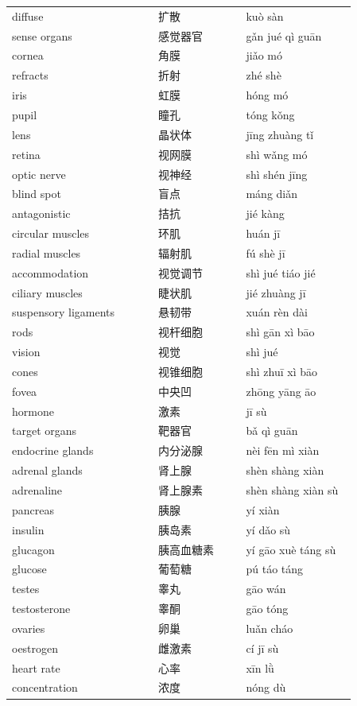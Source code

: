 \documentclass[11pt]{article}
\begin{document}
\begin{longtable}{@{}p{0.40\linewidth}p{0.24\linewidth}p{0.30\linewidth}@{}}
diffuse & 扩散 & kuò sàn \\
sense organs & 感觉器官 & gǎn jué qì guān \\
cornea & 角膜 & jiǎo mó \\
refracts & 折射 & zhé shè \\
iris & 虹膜 & hóng mó \\
pupil & 瞳孔 & tóng kǒng \\
lens & 晶状体 & jīng zhuàng tǐ \\
retina & 视网膜 & shì wǎng mó \\
optic nerve & 视神经 & shì shén jīng \\
blind spot & 盲点 & máng diǎn \\
antagonistic & 拮抗 & jié kàng \\
circular muscles & 环肌 & huán jī \\
radial muscles & 辐射肌 & fú shè jī \\
accommodation & 视觉调节 & shì jué tiáo jié \\
ciliary muscles & 睫状肌 & jié zhuàng jī \\
suspensory ligaments & 悬韧带 & xuán rèn dài \\
rods & 视杆细胞 & shì gān xì bāo \\
vision & 视觉 & shì jué \\
cones & 视锥细胞 & shì zhuī xì bāo \\
fovea & 中央凹 & zhōng yāng āo \\
hormone & 激素 & jī sù \\
target organs & 靶器官 & bǎ qì guān \\
endocrine glands & 内分泌腺 & nèi fēn mì xiàn \\
adrenal glands & 肾上腺 & shèn shàng xiàn \\
adrenaline & 肾上腺素 & shèn shàng xiàn sù \\
pancreas & 胰腺 & yí xiàn \\
insulin & 胰岛素 & yí dǎo sù \\
glucagon & 胰高血糖素 & yí gāo xuè táng sù \\
glucose & 葡萄糖 & pú táo táng \\
testes & 睾丸 & gāo wán \\
testosterone & 睾酮 & gāo tóng \\
ovaries & 卵巢 & luǎn cháo \\
oestrogen & 雌激素 & cí jī sù \\
heart rate & 心率 & xīn lǜ \\
concentration & 浓度 & nóng dù \\

\end{longtable}
\end{document}
